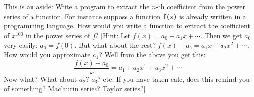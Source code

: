   
  This is an aside:
  Write a program to extract the $n$-th coefficient from the power series
  of a function. 
  For instance suppose a function \texttt{f(x)} is already
  written in a programming language.
  How would you write a function to extract the coefficient of $x^{100}$ in 
  the power series of $f$?
  [Hint: Let $f(x) = a_0 + a_1x + \cdots$. Then we get $a_0$ very easily:
  $a_0 = f(0)$. But what about the rest?
  $f(x) - a_0 = a_1x + a_2x^2 + \cdots$.
  How would you approximate $a_1$? Well from the above you get this:
  \[
    \frac{f(x) - a_0}{x} = a_1 + a_2x^1 + a_3x^2 + \cdots
  \]
  Now what?
  What about $a_2$? $a_3$? etc.
  If you have taken calc, does this remind you of something?
  Maclaurin series? Taylor series?]
